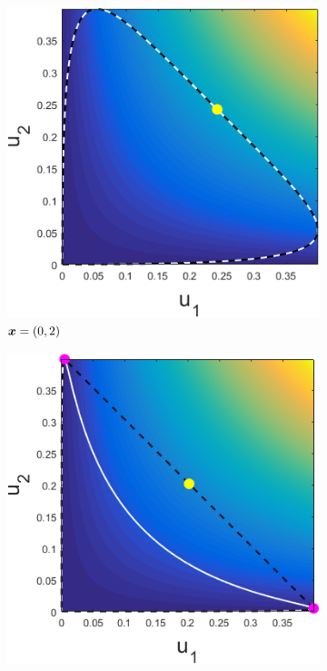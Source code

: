 \begin{figure}[ht]
\begin{subfigure}[t]{0.32\textwidth}
				\includegraphics[width = \textwidth]{Sigma1x1_0-x2_2}
				\caption{${\bm{{x}}} = (0,2)$} \label{subfig:gammaexampleb}
			\end{subfigure}
			\begin{subfigure}[t]{0.32\textwidth}
				\centering
				\includegraphics[width = \textwidth]{Sigma1x1_0-x2_3}

\end{subfigure}
\end{figure}
